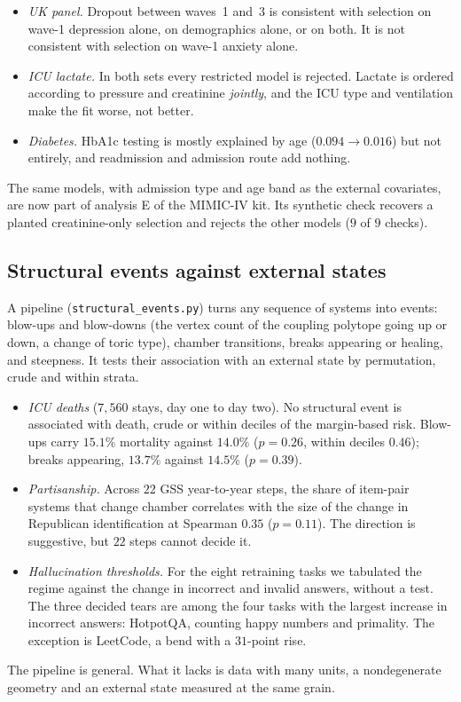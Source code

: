 \documentclass[11pt]{article}
\theoremstyle{definition}
\theoremstyle{remark}
\begin{document}
\begin{itemize}[leftmargin=*,nosep]
\item \emph{UK panel.} Dropout between waves~1 and~3 is consistent with selection on wave-1 depression alone, on demographics alone, or
  on both. It is not consistent with selection on wave-1 anxiety alone.
\item \emph{ICU lactate.} In both sets every restricted model is rejected. Lactate is ordered according to pressure and creatinine
  \emph{jointly}, and the ICU type and ventilation make the fit worse, not better.
\item \emph{Diabetes.} HbA1c testing is mostly explained by age ($0.094\to0.016$) but not entirely, and readmission and admission route
  add nothing.
\end{itemize}
The same models, with admission type and age band as the external covariates, are now part of analysis E of the MIMIC-IV kit. Its
synthetic check recovers a planted creatinine-only selection and rejects the other models ($9$ of $9$ checks).

\subsection{Structural events against external states}\label{sec:events}

A pipeline (\texttt{structural\_events.py}) turns any sequence of systems into events: blow-ups and blow-downs (the vertex count of the
coupling polytope going up or down, a change of toric type), chamber transitions, breaks appearing or healing, and steepness. It tests
their association with an external state by permutation, crude and within strata.
\begin{itemize}[leftmargin=*,nosep]
\item \emph{ICU deaths} ($7{,}560$ stays, day one to day two). No structural event is associated with death, crude or within deciles
  of the margin-based risk. Blow-ups carry $15.1\%$ mortality against $14.0\%$ ($p=0.26$, within deciles $0.46$); breaks appearing,
  $13.7\%$ against $14.5\%$ ($p=0.39$).
\item \emph{Partisanship.} Across $22$ GSS year-to-year steps, the share of item-pair systems that change chamber correlates with the
  size of the change in Republican identification at Spearman $0.35$ ($p=0.11$). The direction is suggestive, but $22$ steps cannot
  decide it.
\item \emph{Hallucination thresholds.} For the eight retraining tasks we tabulated the regime against the change in incorrect and invalid
  answers, without a test. The three decided tears are among the four tasks with the largest increase in incorrect answers: HotpotQA,
  counting happy numbers and primality. The exception is LeetCode, a bend with a $31$-point rise.
\end{itemize}
The pipeline is general. What it lacks is data with many units, a nondegenerate geometry and an external state measured at the same
grain.
\end{document}
